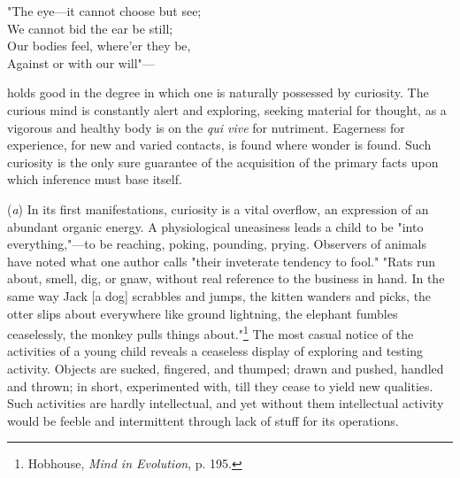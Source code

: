 \documentclass[letterpaper]{book}
\begin{document}
{"The eye---it cannot choose but see;\\
} {We cannot bid the ear be still;\\
} {Our bodies feel, where'er they be,\\
} {Against or with our will"---\\
}

holds good in the degree in which one is naturally possessed by
curiosity. The curious mind is constantly alert and exploring, seeking
material for thought, as a vigorous and healthy body is on the \emph{qui
vive} for nutriment. Eagerness for experience, for new and varied
contacts, is found where wonder is found. Such curiosity is the only
sure guarantee of the acquisition of the primary facts upon which
inference must base itself.


(\emph{a}) In its first manifestations, curiosity is a vital overflow,
an expression of an abundant organic energy. A physiological uneasiness
leads a child to be "into everything,"---to be reaching, poking,
pounding, prying. Observers of animals have noted what one author calls
"their inveterate tendency to fool." "Rats run about, smell, dig, or
gnaw, without real reference to the business in hand. In the same way
Jack {[}a dog{]} scrabbles and jumps, the kitten wanders and picks, the
otter slips about everywhere like ground lightning, the elephant fumbles
ceaselessly, the monkey pulls things
about."\footnote{Hobhouse, \emph{Mind in Evolution}, p. 195. }
The most casual notice of the activities of a young child reveals a
ceaseless display of exploring and testing activity. Objects are sucked,
fingered, and thumped; drawn and pushed, handled and thrown; in short,
experimented
with, till they cease to yield new qualities. Such activities are hardly
intellectual, and yet without them intellectual activity would be feeble
and intermittent through lack of stuff for its operations.

\end{document}
